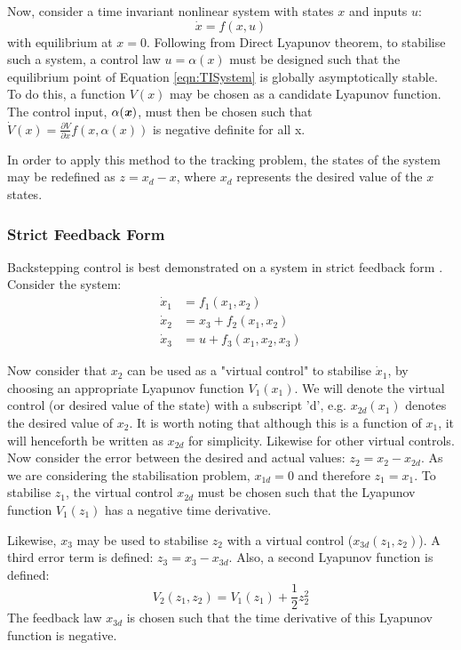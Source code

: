 Now, consider a time invariant nonlinear system with states $x$ and inputs $u$:
\begin{equation}\label{eqn:TISystem}
\dot{x}=f(x,u)
\end{equation}
with equilibrium at $x=0$. Following from Direct Lyapunov theorem, to stabilise such a system, a control law $u=\alpha(x)$ must be designed such that the equilibrium point of Equation \ref{eqn:TISystem} is globally asymptotically stable. To do this, a function $V(x)$ may be chosen as a candidate Lyapunov function. The control input, $\alpha(\textbf{\textit{x}})$, must then be chosen such that $\dot{V}(x)=\frac{\partial V}{\partial x}f(x,\alpha(x))$ is negative definite for all x. 

In order to apply this method to the tracking problem, the states of the system may be redefined as $z=x_{d}-x$, where $x_{d}$ represents the desired value of the $x$ states.

\subsubsection{Strict Feedback Form}
Backstepping control is best demonstrated on a system in strict feedback form \cite{1992a}. Consider the system:
\begin{equation*}
\begin{split}
\dot{x}_{1}&=f_{1}(x_{1},x_{2})\\
\dot{x}_{2}&=x_{3}+f_{2}(x_{1},x_{2})\\
\dot{x}_{3}&=u +f_{3}(x_{1},x_{2}, x_{3})
\end{split}
\end{equation*}

Now consider that $x_{2}$ can be used as a "virtual control" to stabilise $\dot{x}_{1}$, by choosing an appropriate Lyapunov function $V_{1}(x_{1})$. We will denote the virtual control (or desired value of the state) with a subscript 'd', e.g. $x_{2d}(x_{1})$ denotes the desired value of $x_{2}$. It is worth noting that although this is a function of $x_{1}$, it will henceforth be written as $x_{2d}$ for simplicity. Likewise for other virtual controls.  Now consider the error between the desired and actual values: $z_{2}=x_{2}-x_{2d}$. As we are considering the stabilisation problem, $x_{1d}=0$ and therefore $z_{1}=x_{1}$. To stabilise $z_{1}$, the virtual control $x_{2d}$ must be chosen such that the Lyapunov function $V_{1}(z_{1})$ has a negative time derivative.

Likewise, $x_{3}$ may be used to stabilise $z_{2}$ with a virtual control ($x_{3d}(z_{1},z_{2})$). A third error term is defined: $z_{3}=x_{3}-x_{3d}$. Also, a second Lyapunov function is defined: 
\begin{equation*}
V_{2}(z_{1},z_{2})=V_{1}(z_{1})+\frac{1}{2}z_{2}^{2}
\end{equation*}
The feedback law $x_{3d}$ is chosen such that the time derivative of this Lyapunov function is negative. 


